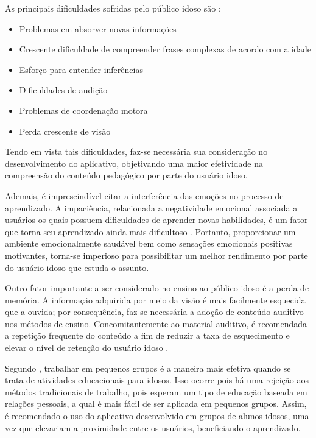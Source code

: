 As principais dificuldades sofridas pelo público idoso são \citep{euromed}:

\begin{itemize}
    \item Problemas em absorver novas informações
    \item Crescente dificuldade de compreender frases complexas de acordo com a idade
    \item Esforço para entender inferências
    \item Dificuldades de audição
    \item Problemas de coordenação motora
    \item Perda crescente de visão
\end{itemize}

Tendo em vista tais dificuldades, faz-se necessária sua consideração no desenvolvimento do aplicativo, objetivando uma maior efetividade na compreensão do conteúdo pedagógico por parte do usuário idoso.

Ademais, é imprescindível citar a interferência das emoções no processo de aprendizado. A impaciência, relacionada a negatividade emocional associada a usuários os quais possuem dificuldades de aprender novas habilidades, é um fator que torna seu aprendizado ainda mais dificultoso \citep{Edukacja}. Portanto, proporcionar um ambiente emocionalmente saudável bem como sensações emocionais positivas motivantes, torna-se imperioso para possibilitar um melhor rendimento por parte do usuário idoso que estuda o assunto.

Outro fator importante a ser considerado no ensino ao público idoso é a perda de memória. A informação adquirida por meio da visão é mais facilmente esquecida que a ouvida; por consequência,  faz-se necessária a adoção de conteúdo auditivo nos métodos de ensino. Concomitantemente ao material auditivo, é recomendada a repetição frequente do conteúdo a fim de reduzir a taxa de esquecimento e elevar o nível de retenção do usuário idoso \citep{euromed}.

Segundo \cite{Edukacja}, trabalhar em pequenos grupos é a maneira mais efetiva quando se trata de atividades educacionais para idosos. Isso ocorre pois há uma rejeição aos métodos tradicionais de trabalho, pois esperam um tipo de educação baseada em relações pessoais, a qual é mais fácil de ser aplicada em pequenos grupos. Assim, é recomendado o uso do aplicativo desenvolvido em grupos de alunos idosos, uma vez que elevariam a proximidade entre os usuários, beneficiando o aprendizado.

